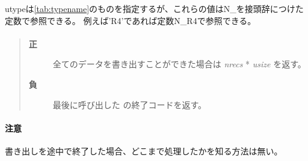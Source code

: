 utypeは\ref{tab:typename}のものを指定するが、これらの値はN\_を接頭辞につけた定数で参照できる。
例えば'R4'であれば定数N\_R4で参照できる。

\paragraph{\ResultCode}
\begin{quote}
\begin{description}
\item[{\bf 正}] 全てのデータを書き出すことができた場合は {\it nrecs} * {\it usize} を返す。
\item[{\bf 負}] 最後に呼び出した  の終了コードを返す。
\end{description}\end{quote}

\paragraph{ 注意 }
書き出しを途中で終了した場合、どこまで処理したかを知る方法は無い。
